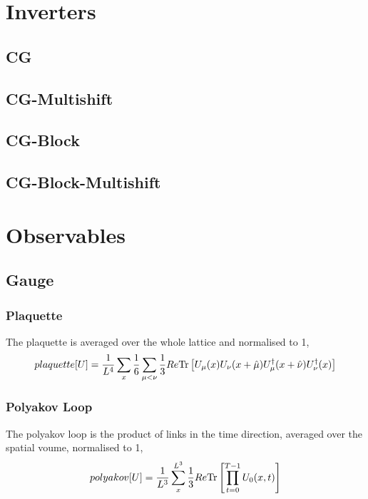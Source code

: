 \documentclass[a4paper,12pt]{article}
\newcommand{\Tr}{{\rm Tr}}
\begin{document}
\section{Inverters}
\subsection{CG}
\subsection{CG-Multishift}
\subsection{CG-Block}
\subsection{CG-Block-Multishift}

\section{Observables}
\subsection{Gauge}
\subsubsection{Plaquette}
The plaquette is averaged over the whole lattice and normalised to 1,
\begin{equation}
 plaquette[U] = \frac{1}{L^4} \sum_x \frac{1}{6}\sum_{\mu<\nu} \frac{1}{3} Re \Tr \left[ U_{\mu}(x)  U_{\nu}(x+\hat\mu)  U_{\mu}^{\dagger}(x+\hat\nu)  U_{\nu}^{\dagger}(x)\right]
\end{equation}

\subsubsection{Polyakov Loop}
The polyakov loop is the product of links in the time direction, averaged over the spatial voume, normalised to 1,
\begin{equation}
 polyakov[U] = \frac{1}{L^3} \sum_x^{L^3} \frac{1}{3} Re \Tr \left[\prod_{t=0}^{T-1} U_{0}(x, t)\right]
\end{equation}
\end{document}

